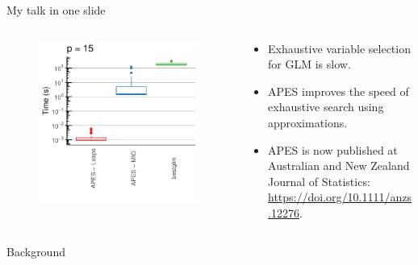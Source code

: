 \documentclass[12pt,aspectratio=169]{beamer}
\begin{document}
\begin{frame}{My talk in one slide}
\begin{columns}
	\begin{column}{0.5\linewidth}
		\begin{figure}
			\centering
			\includegraphics[width=\linewidth]{goldStandardTimePlot_EcoSta_2019_Jun_24}
		\end{figure}
	\end{column}
	\begin{column}{0.5\linewidth}
\begin{itemize}
	\item Exhaustive variable selection for GLM is slow. 
	\item APES improves the speed of exhaustive search using approximations. 
	\item APES is now published at Australian and New Zealand Journal of Statistics: \\ \url{https://doi.org/10.1111/anzs.12276}. 
\end{itemize}
	\end{column}
\end{columns}
\end{frame}


\begin{frame}
\Huge{\color{themeBlue} Background}
\end{frame}
\end{document}
